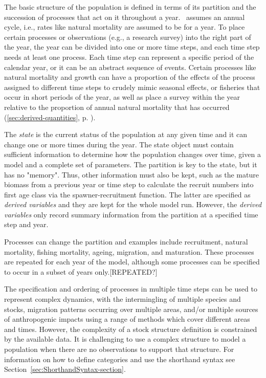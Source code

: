 The basic structure of the population is defined in terms of its partition and the succession of processes that act on it throughout a year. \CNAME~assumes an annual cycle, i.e., rates like natural mortality are assumed to be for a year. To place certain processes or observations (e.g., a research survey) into the right part of the year, the year can be divided into one or more time steps, and each time step needs  at least one process. Each time step can represent a specific period of the calendar year, or it can be an abstract sequence of events. Certain processes like natural mortality and growth can have a proportion of the effects of the process assigned to different time steps to crudely mimic seasonal effects, or fisheries that occur in short periods of the year, as well as place a survey within the year relative to the proportion of annual natural mortality that has occurred (\ref{sec:derived-quantities}, p. \pageref{sec:derived-quantities}).

The \textit{state} is the current status of the population at any given time and it can change one or more times during the year. The state object must contain sufficient information to determine how the population changes over time, given a model and a complete set of parameters. The partition is key to the state, but it has no "memory". Thus, other information must also be kept, such as the mature biomass from a previous year or time step to calculate the recruit numbers into first age class via the spawner-recruitment function. The latter are specified as \textit{derived variables} and they are kept for the whole model run. However, the  \textit{derived variables} only record summary information from the partition at a specified time step and year.

Processes can change the partition and examples include 
recruitment, natural mortality, fishing mortality, ageing, migration, and maturation. These processes are repeated for each year of the model, although some processes can be specified to occur in a subset of years only.[REPEATED?]

The specification and ordering of processes in multiple time steps can be used to represent complex dynamics, with the intermingling of multiple species and stocks, migration patterns occurring over multiple areas, and/or multiple sources of anthropogenic impacts using a range of methods which cover different areas and times.
However, the complexity of a stock structure definition is constrained by the available data. It is challenging to use a complex structure to model a population when there are no observations to support that structure.  For information on how to define categories and use the shorthand syntax see Section~\ref{sec:ShorthandSyntax-section}.

